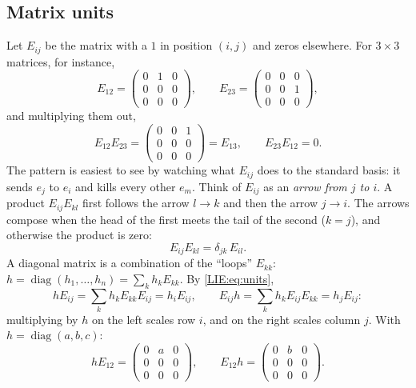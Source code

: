 \documentclass[11pt,openany]{book}
\theoremstyle{plain}
\theoremstyle{definition}
\theoremstyle{remark}
\begin{document}
\subsection*{Matrix units}
Let $E_{ij}$ be the matrix with a $1$ in position $(i,j)$ and zeros elsewhere. For $3\times3$ matrices,
for instance,
\[
  E_{12}=\begin{pmatrix}0&1&0\\0&0&0\\0&0&0\end{pmatrix},\qquad
  E_{23}=\begin{pmatrix}0&0&0\\0&0&1\\0&0&0\end{pmatrix},
\]
and multiplying them out,
\[
  E_{12}E_{23}=\begin{pmatrix}0&0&1\\0&0&0\\0&0&0\end{pmatrix}=E_{13},\qquad
  E_{23}E_{12}=0 .
\]
The pattern is easiest to see by watching what $E_{ij}$ does to the standard basis: it sends $e_j$ to
$e_i$ and kills every other $e_m$. Think of $E_{ij}$ as an \emph{arrow from $j$ to $i$}. A product
$E_{ij}E_{kl}$ first follows the arrow $l\to k$ and then the arrow $j\to i$. The arrows compose when
the head of the first meets the tail of the second ($k=j$), and otherwise the product is zero:
\begin{equation}\label{LIE:eq:units}
  E_{ij}E_{kl}=\delta_{jk}\,E_{il}.
\end{equation}
A diagonal matrix is a combination of the ``loops'' $E_{kk}$:
$h=\operatorname{diag}(h_1,\dots,h_n)=\sum_kh_kE_{kk}$. By \eqref{LIE:eq:units},
\[
  hE_{ij}=\sum_kh_kE_{kk}E_{ij}=h_iE_{ij},\qquad E_{ij}h=\sum_kh_kE_{ij}E_{kk}=h_jE_{ij}:
\]
multiplying by $h$ on the left scales row $i$, and on the right scales column $j$. With
$h=\operatorname{diag}(a,b,c)$:
\[
  hE_{12}=\begin{pmatrix}0&a&0\\0&0&0\\0&0&0\end{pmatrix},\qquad
  E_{12}h=\begin{pmatrix}0&b&0\\0&0&0\\0&0&0\end{pmatrix}.
\]
\end{document}
